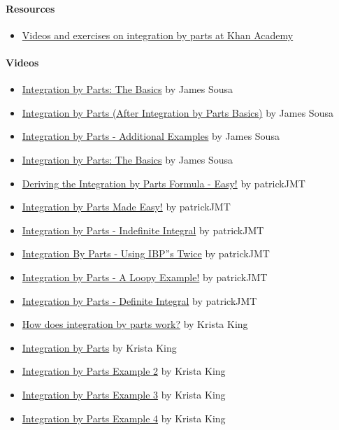 \paragraph{Resources}

\begin{itemize}
    \item \href{https://www.khanacademy.org/math/integral-calculus/integration-techniques/integration_by_parts/}{Videos and exercises on integration by parts at Khan Academy}
\end{itemize}

\paragraph{Videos}

\begin{itemize}
    \item \href{https://youtu.be/815s-YB9X44}{Integration by Parts: The Basics} by James Sousa
    \item \href{https://youtu.be/hfJ1zPizj_s}{Integration by Parts (After Integration by Parts Basics)} by James Sousa
    \item \href{https://youtu.be/_kJNhoTJ4D4}{Integration by Parts - Additional Examples} by James Sousa
    \item \href{https://youtu.be/815s-YB9X44}{Integration by Parts: The Basics} by James Sousa
    \item \href{https://youtu.be/q_BP4LyvdOA}{Deriving the Integration by Parts Formula - Easy!} by patrickJMT
    \item \href{https://youtu.be/dqaDSlYdRcs}{Integration by Parts Made Easy!} by patrickJMT
    \item \href{https://youtu.be/97RasvYIvl4}{Integration by Parts - Indefinite Integral} by patrickJMT
    \item \href{https://youtu.be/_MuKOm8IHBA}{Integration By Parts - Using IBP''s Twice} by patrickJMT
    \item \href{https://youtu.be/L8HoALsls-E}{Integration by Parts - A Loopy Example!} by patrickJMT
    \item \href{https://youtu.be/zGGI4PkHzhI}{Integration by Parts - Definite Integral} by patrickJMT
    \item \href{https://youtu.be/Eb5EDMHDnx8}{How does integration by parts work?} by Krista King
    \item \href{https://youtu.be/SlBp9hZBqaQ}{Integration by Parts} by Krista King
    \item \href{https://youtu.be/s8l1vs4gjtY}{Integration by Parts Example 2} by Krista King
    \item \href{https://youtu.be/0clmZGVl0ss}{Integration by Parts Example 3} by Krista King
    \item \href{https://youtu.be/CxV5HE6chSY}{Integration by Parts Example 4} by Krista King
\end{itemize}

